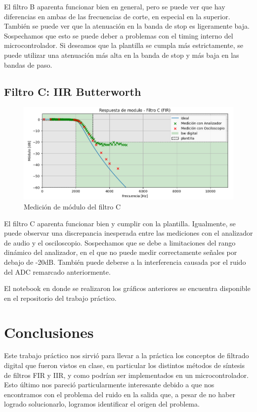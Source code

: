 \documentclass[11pt,a4paper]{report}
\begin{document}
El filtro B aparenta funcionar bien en general, pero se puede ver que hay diferencias en ambas de las frecuencias de corte, en especial en la superior. También se puede ver que la atenuación en la banda de stop es ligeramente baja. Sospechamos que esto se puede deber a problemas con el timing interno del microcontrolador. Si deseamos que la plantilla se cumpla más estrictamente, se puede utilizar una atenuación más alta en la banda de stop y más baja en las bandas de paso.


\section{Filtro C: IIR Butterworth}

\begin{figure}[h]
    \centering
    \includegraphics[scale=0.7]{figs/filtro_c.png}
    \caption{Medición de módulo del filtro C}
\end{figure}

El filtro C aparenta funcionar bien y cumplir con la plantilla. Igualmente, se puede observar una discrepancia inesperada entre las mediciones con el analizador de audio y el osciloscopio. Sospechamos que se debe a limitaciones del rango dinámico del analizador, en el que no puede medir correctamente señales por debajo de -20dB. También puede deberse a la interferencia causada por el ruido del ADC remarcado anteriormente.

El notebook en donde se realizaron los gráficos anteriores se encuentra disponible en el repositorio del trabajo práctico. \cite{notebook_analisis}

\chapter{Conclusiones}

Este trabajo práctico nos sirvió para llevar a la práctica los conceptos de filtrado digital que fueron vistos en clase, en particular los distintos métodos de síntesis de filtros FIR y IIR, y como podrían ser implementados en un microcontrolador. Esto último nos pareció particularmente interesante debido a que nos encontramos con el problema del ruido en la salida que, a pesar de no haber logrado solucionarlo, logramos identificar el origen del problema.
\end{document}
